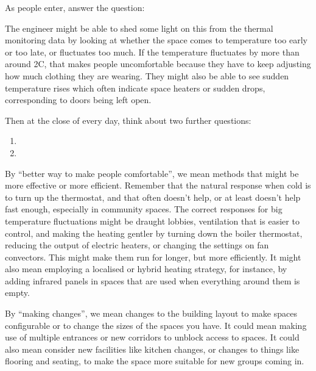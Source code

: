 \documentclass[letterpaper,10pt,english]{jupyterBook}
\begin{document}
\sphinxAtStartPar
As people enter, answer the question:  

\sphinxAtStartPar
The engineer might be able to shed some light on this from the thermal monitoring data by looking at whether the space comes to temperature too early or too late, or fluctuates too much.  If the temperature fluctuates by more than around 2C, that makes people uncomfortable because they have to keep adjusting how much clothing they are wearing.  They might also be able to see sudden temperature rises \sphinxhyphen{} which often indicate space heaters \sphinxhyphen{} or sudden drops, corresponding to doors being left open.

\sphinxAtStartPar
Then at the close of every day, think about two further questions:
\begin{enumerate}
%
\item {} 
\sphinxAtStartPar
{}

\item {} 
\sphinxAtStartPar
{}

\end{enumerate}

\sphinxAtStartPar
By “better way to make people comfortable”, we mean methods that might be more effective or more efficient.  Remember that the natural response when cold is to turn up the thermostat, and that often doesn’t help, or at least doesn’t help fast enough, especially in community spaces.  The correct responses for big temperature fluctuations might be draught lobbies, ventilation that is easier to control, and making the heating gentler by turning down the boiler thermostat, reducing the output of electric heaters, or changing the settings on fan convectors.  This might make them run for longer, but more efficiently.  It might also mean employing a localised or hybrid heating strategy, for instance, by adding infrared panels in spaces that are used when everything around them is empty.

\sphinxAtStartPar
By “making changes”, we mean changes to the building layout to make spaces configurable or to change the sizes of the spaces you have.  It could mean making use of multiple entrances or new corridors to unblock access to spaces.  It could also mean consider new facilities like kitchen changes, or changes to things like flooring and seating, to make the space more suitable for new groups coming in.
\end{document}
